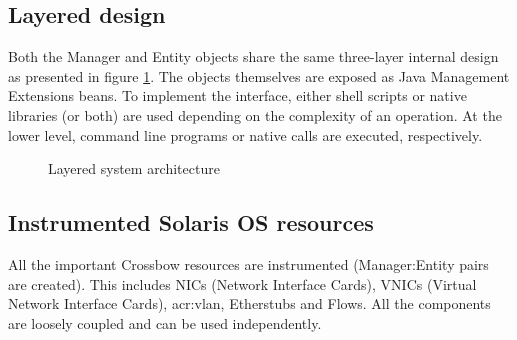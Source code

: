 \documentclass[11pt]{book}
\begin{document}
      \subsection{Layered design}

        Both the Manager and Entity objects share the same three-layer internal design as presented in figure
        \ref{fig:arch:laydes}. The objects themselves are exposed as Java Management Extensions beans. To implement the
        interface, either shell scripts or native libraries (or both) are used depending on the complexity of an
        operation. At the lower level, command line programs or native calls are executed, respectively.

        \begin{figure}[H]
          \begin{center}
          \end{center}

          \caption{Layered system architecture}
          \label{fig:arch:laydes}
        \end{figure}


      \subsection{Instrumented Solaris OS resources}

        All the important Crossbow resources are instrumented (Manager:Entity pairs are created). This includes NICs
        (Network Interface Cards), VNICs (Virtual Network Interface Cards), \gls{acr:vlan}, Etherstubs and Flows.  All
        the components are loosely coupled and can be used independently.
\end{document}
